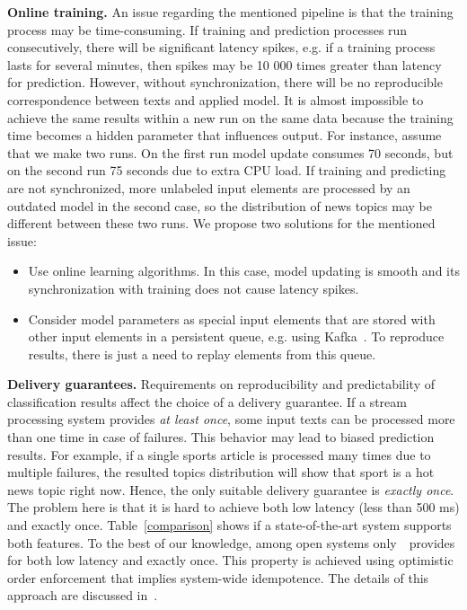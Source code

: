 \label {fs-challenges}

\indent

{\bf Online training.} An issue regarding the mentioned pipeline is that the training process may be time-consuming. If training and prediction processes run consecutively, there will be significant latency spikes, e.g. if a training process lasts for several minutes, then spikes may be 10 000 times greater than latency for prediction. However, without synchronization, there will be no reproducible correspondence between texts and applied model. It is almost impossible to achieve the same results within a new run on the same data because the training time becomes a hidden parameter that influences output. For instance, assume that we make two runs. On the first run model update consumes 70 seconds, but on the second run 75 seconds due to extra CPU load. If training and predicting are not synchronized, more unlabeled input elements are processed by an outdated model in the second case, so the distribution of news topics may be different between these two runs. We propose two solutions for the mentioned issue:

\begin{itemize}
    \item Use online learning algorithms. In this case, model updating is smooth and its synchronization with training does not cause latency spikes.
    \item Consider model parameters as special input elements that are stored with other input elements in a persistent queue, e.g. using Kafka~\cite{kreps2011kafka}. To reproduce results, there is just a need to replay elements from this queue.
\end{itemize}

{\bf Delivery guarantees.} Requirements on reproducibility and predictability of classification results affect the choice of a delivery guarantee. If a stream processing system provides {\em at least once}, some input texts can be processed more than one time in case of failures. This behavior may lead to biased prediction results. For example, if a single sports article is processed many times due to multiple failures, the resulted topics distribution will show that sport is a hot news topic right now. Hence, the only suitable delivery guarantee is {\em exactly once}. The problem here is that it is hard to achieve both low latency (less than 500 ms) and exactly once. Table~\ref{comparison} shows if a state-of-the-art system supports both features. To the best of our knowledge, among open systems only~\FlameStream\ provides for both low latency and exactly once. This property is achieved using optimistic order enforcement that implies system-wide idempotence. The details of this approach are discussed in~\cite{we2018adbis, we2018beyondmr}.

